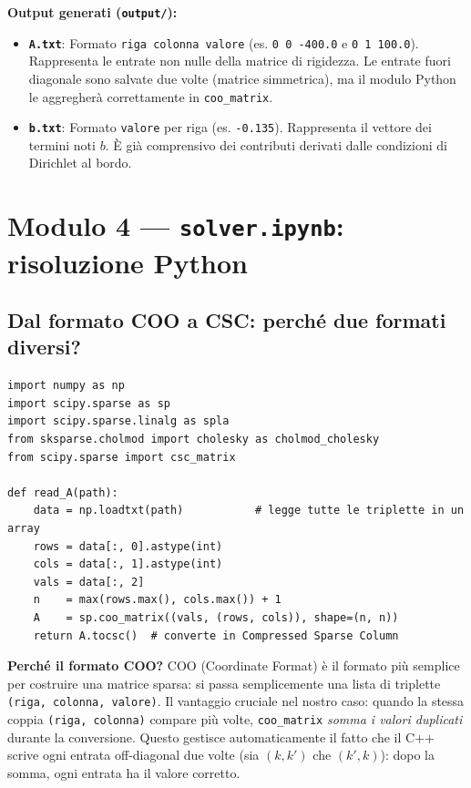 \documentclass[a4paper,11pt]{article}
\theoremstyle{definition}
\begin{document}
\textbf{Output generati (\texttt{output/}):}
\begin{itemize}
  \item \textbf{\texttt{A.txt}}: Formato \texttt{riga colonna valore} (es. \texttt{0 0 -400.0} e \texttt{0 1 100.0}). Rappresenta le entrate non nulle della matrice di rigidezza. Le entrate fuori diagonale sono salvate due volte (matrice simmetrica), ma il modulo Python le aggregherà correttamente in \texttt{coo\_matrix}.
  \item \textbf{\texttt{b.txt}}: Formato \texttt{valore} per riga (es. \texttt{-0.135}). Rappresenta il vettore dei termini noti $b$. È già comprensivo dei contributi derivati dalle condizioni di Dirichlet al bordo.
\end{itemize}

\newpage
\section{Modulo 4 — \texttt{solver.ipynb}: risoluzione Python}

\subsection{Dal formato COO a CSC: perché due formati diversi?}

\begin{lstlisting}[style=python, caption={Lettura di A.txt in COO e conversione in CSC}]
import numpy as np
import scipy.sparse as sp
import scipy.sparse.linalg as spla
from sksparse.cholmod import cholesky as cholmod_cholesky
from scipy.sparse import csc_matrix

def read_A(path):
    data = np.loadtxt(path)           # legge tutte le triplette in un array
    rows = data[:, 0].astype(int)
    cols = data[:, 1].astype(int)
    vals = data[:, 2]
    n    = max(rows.max(), cols.max()) + 1
    A    = sp.coo_matrix((vals, (rows, cols)), shape=(n, n))
    return A.tocsc()  # converte in Compressed Sparse Column
\end{lstlisting}

\textbf{Perché il formato COO?} COO (Coordinate Format) è il formato più semplice per costruire una matrice sparsa: si passa semplicemente una lista di triplette \texttt{(riga, colonna, valore)}. Il vantaggio cruciale nel nostro caso: quando la stessa coppia \texttt{(riga, colonna)} compare più volte, \texttt{coo\_matrix} \emph{somma i valori duplicati} durante la conversione. Questo gestisce automaticamente il fatto che il C++ scrive ogni entrata off-diagonal due volte (sia $(k,k')$ che $(k',k)$): dopo la somma, ogni entrata ha il valore corretto.
\end{document}
